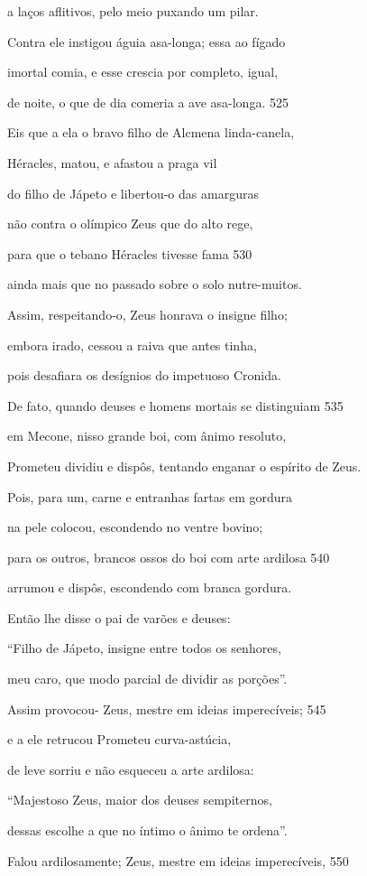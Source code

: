 a laços aflitivos, pelo meio puxando um pilar.

Contra ele instigou águia asa-longa; essa ao fígado

imortal comia, e esse crescia por completo, igual,

de noite, o que de dia comeria a ave asa-longa. \num{525}

Eis que a ela o bravo filho de Alcmena linda-canela,

Héracles, matou, e afastou a praga vil

do filho de Jápeto e libertou-o das amarguras

não contra o olímpico Zeus que do alto rege,

para que o tebano Héracles tivesse fama \num{530}

ainda mais que no passado sobre o solo nutre-muitos.

Assim, respeitando-o, Zeus honrava o insigne filho;

embora irado, cessou a raiva que antes tinha,

pois desafiara os desígnios do impetuoso Cronida.

\quad{}De fato, quando deuses e homens mortais se distinguiam \num{535}

em Mecone, nisso grande boi, com ânimo resoluto,

Prometeu dividiu e dispôs, tentando enganar o espírito de Zeus.

Pois, para um, carne e entranhas fartas em gordura

na pele colocou, escondendo no ventre bovino;

para os outros, brancos ossos do boi com arte ardilosa \num{540}

arrumou e dispôs, escondendo com branca gordura.

\quad{}Então lhe disse o pai de varões e deuses:

``Filho de Jápeto, insigne entre todos os senhores,

meu caro, que modo parcial de dividir as porções''.

\quad{}Assim provocou- Zeus, mestre em ideias imperecíveis; \num{545}

e a ele retrucou Prometeu curva-astúcia,

de leve sorriu e não esqueceu a arte ardilosa:

``Majestoso Zeus, maior dos deuses sempiternos,

dessas escolhe a que no íntimo o ânimo te ordena''.

\quad{}Falou ardilosamente; Zeus, mestre em ideias imperecíveis, \num{550}

